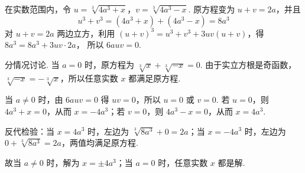\begin{solution}
在实数范围内，令 \(u=\sqrt[3]{4a^3+x}\)，\(v=\sqrt[3]{4a^3-x}\).
原方程变为 \(u+v=2a\)，并且
\[
u^3+v^3=\left(4a^3+x\right)+\left(4a^3-x\right)=8a^3
\]
对 \(u+v=2a\) 两边立方，利用 \(\left(u+v\right)^3=u^3+v^3+3uv\left(u+v\right)\)，得
\(8a^3=8a^3+3uv\cdot2a\)，
所以 \(6auv=0\).

分情况讨论. 当 \(a=0\) 时，原方程为 \(\sqrt[3]{x}+\sqrt[3]{-x}=0\). 由于实立方根是奇函数，\(\sqrt[3]{-x}=-\sqrt[3]{x}\)，所以任意实数 \(x\) 都满足原方程.

当 \(a\ne0\) 时，由 \(6auv=0\) 得 \(uv=0\)，所以 \(u=0\) 或 \(v=0\). 若 \(u=0\)，则 \(4a^3+x=0\)，从而 \(x=-4a^3\)；若 \(v=0\)，则 \(4a^3-x=0\)，从而 \(x=4a^3\).

反代检验：当 \(x=4a^3\) 时，左边为 \(\sqrt[3]{8a^3}+0=2a\)；当 \(x=-4a^3\) 时，左边为 \(0+\sqrt[3]{8a^3}=2a\)，两值均满足原方程.

故当 \(a\ne0\) 时，解为 \(x=\pm4a^3\)；当 \(a=0\) 时，任意实数 \(x\) 都是解.
\end{solution}
